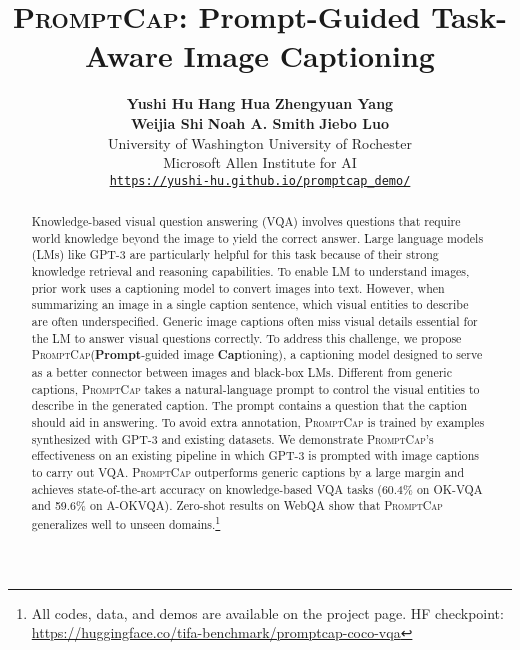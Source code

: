 \documentclass[10pt,twocolumn,letterpaper]{article}
\newcommand{\NAME}{\textsc{PromptCap}\xspace}
\begin{document}
\title{\NAME: Prompt-Guided Task-Aware Image Captioning}

\author{
     \textbf{Yushi Hu} \quad
     \textbf{Hang Hua}\quad
     \textbf{Zhengyuan Yang}\quad \\
     \textbf{Weijia Shi}\quad
     \textbf{Noah A. Smith}\quad
     \textbf{Jiebo Luo}\quad\\
     University of Washington\quad
     University of Rochester\\
     Microsoft\quad
     Allen Institute for AI\\
     {\tt \textcolor{pink}{\url{https://yushi-hu.github.io/promptcap_demo/}}}
}

\maketitle
\ificcvfinal\thispagestyle{empty}\fi


\begin{abstract}
Knowledge-based visual question answering (VQA) involves questions that require world knowledge beyond the image to yield the correct answer. Large language models (LMs) like GPT-3 are particularly helpful for this task because of their strong knowledge retrieval and reasoning capabilities. 
To enable LM to understand images, prior work uses a captioning model to convert images into text.
However, when summarizing an image in a single caption sentence, which visual entities to describe are often underspecified. 
Generic image captions often miss visual details essential for the LM to answer visual questions correctly.
To address this challenge, we propose \NAME (\textbf{Prompt}-guided image \textbf{Cap}tioning), a captioning model designed to serve as a better connector between images and black-box LMs.
Different from generic captions, \NAME takes a natural-language prompt to control the visual entities to describe in the generated caption. The prompt contains a question that the caption should aid in answering.
To avoid extra annotation, \NAME is trained by examples synthesized with GPT-3 and existing datasets.
We demonstrate \NAME's effectiveness on an existing pipeline in which GPT-3 is prompted with image captions to carry out VQA.
\NAME outperforms generic captions by a large margin and achieves state-of-the-art accuracy on knowledge-based VQA tasks (60.4\% on OK-VQA and 59.6\% on A-OKVQA).
Zero-shot results on WebQA show that \NAME generalizes well to unseen domains.\footnote{All codes, data, and demos are available on the project page. HF checkpoint: \url{https://huggingface.co/tifa-benchmark/promptcap-coco-vqa}}

 \end{abstract}
\end{document}
